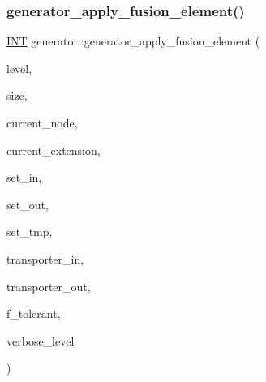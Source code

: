 \subsubsection{\texorpdfstring{generator\+\_\+apply\+\_\+fusion\+\_\+element()}{generator\_apply\_fusion\_element()}}
{\footnotesize\ttfamily \mbox{\hyperlink{galois_8h_a09fddde158a3a20bd2dcadb609de11dc}{I\+NT}} generator\+::generator\+\_\+apply\+\_\+fusion\+\_\+element (\begin{DoxyParamCaption}\item[{\mbox{\hyperlink{galois_8h_a09fddde158a3a20bd2dcadb609de11dc}{I\+NT}}}]{level,  }\item[{\mbox{\hyperlink{galois_8h_a09fddde158a3a20bd2dcadb609de11dc}{I\+NT}}}]{size,  }\item[{\mbox{\hyperlink{galois_8h_a09fddde158a3a20bd2dcadb609de11dc}{I\+NT}}}]{current\+\_\+node,  }\item[{\mbox{\hyperlink{galois_8h_a09fddde158a3a20bd2dcadb609de11dc}{I\+NT}}}]{current\+\_\+extension,  }\item[{\mbox{\hyperlink{galois_8h_a09fddde158a3a20bd2dcadb609de11dc}{I\+NT}} $\ast$}]{set\+\_\+in,  }\item[{\mbox{\hyperlink{galois_8h_a09fddde158a3a20bd2dcadb609de11dc}{I\+NT}} $\ast$}]{set\+\_\+out,  }\item[{\mbox{\hyperlink{galois_8h_a09fddde158a3a20bd2dcadb609de11dc}{I\+NT}} $\ast$}]{set\+\_\+tmp,  }\item[{\mbox{\hyperlink{galois_8h_a09fddde158a3a20bd2dcadb609de11dc}{I\+NT}} $\ast$}]{transporter\+\_\+in,  }\item[{\mbox{\hyperlink{galois_8h_a09fddde158a3a20bd2dcadb609de11dc}{I\+NT}} $\ast$}]{transporter\+\_\+out,  }\item[{\mbox{\hyperlink{galois_8h_a09fddde158a3a20bd2dcadb609de11dc}{I\+NT}}}]{f\+\_\+tolerant,  }\item[{\mbox{\hyperlink{galois_8h_a09fddde158a3a20bd2dcadb609de11dc}{I\+NT}}}]{verbose\+\_\+level }\end{DoxyParamCaption})}

\mbox{\label{classgenerator_af24208532adef9662cb46fbb57daa0f5}} 
